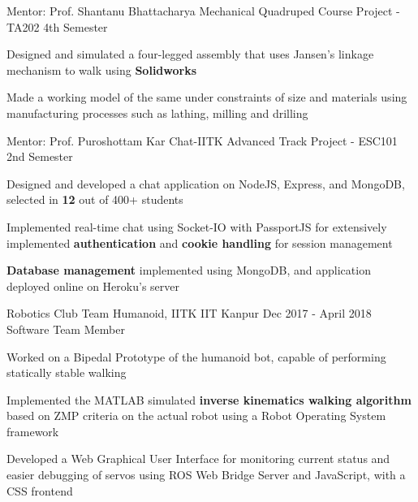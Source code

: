 \begin{cventries}
  \cventry
    {Mentor: Prof. Shantanu Bhattacharya}
    {Mechanical Quadruped}
    {Course Project -TA202}
    {4th Semester}
    {
      \begin{cvitems}
        \item Designed and simulated a four-legged assembly that uses Jansen's linkage mechanism to walk using \textbf{Solidworks}
        \item Made a working model of the same under constraints of size and materials using manufacturing processes such as lathing, milling and drilling
      \end{cvitems}
    } 

  \cventry
    {Mentor: Prof. Puroshottam Kar}
    {Chat-IITK}
    {Advanced Track Project - ESC101}
    {2nd Semester}
    {
      \begin{cvitems}
        \item {Designed and developed a chat application on NodeJS, Express, and MongoDB, selected in \textbf{12} out of 400+ students}
        \item {Implemented real-time chat using Socket-IO with PassportJS for extensively implemented \textbf{authentication} and \textbf{cookie handling} for session management}
        \item {\textbf{Database management} implemented using MongoDB, and application deployed online on Heroku's server}
      \end{cvitems}
    }

  \smallcventry
    {Robotics Club}
    {Team Humanoid, IITK}
    {IIT Kanpur}
    {Dec 2017 - April 2018} 
    {Software Team Member}
    {
      \begin{cvitems} 
        \item {Worked on a Bipedal Prototype of the humanoid bot, capable of performing statically stable walking}
        \item {Implemented the MATLAB simulated \textbf{inverse kinematics walking algorithm} based on ZMP criteria on the actual robot using a Robot Operating System framework}
        \item {Developed a Web Graphical User Interface for monitoring current status and easier debugging of servos using ROS Web Bridge Server and JavaScript, with a CSS frontend}

      \end{cvitems}
    }


\end{cventries}
\vspace{-2mm}


